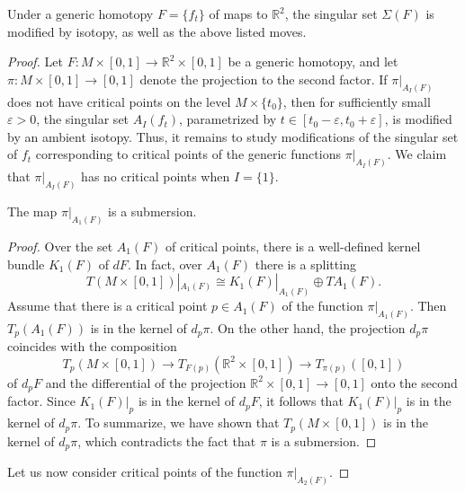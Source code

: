 \documentclass[10pt,a4paper]{amsart}
\def \R{\mathbb{R}}
\def\co{\colon}
\begin{document}
\begin{theorem}\label{th:4}  Under a generic homotopy $F = \{f_t\}$ of maps to $\R^2$, the singular set $\Sigma(F)$ is modified by isotopy,  as well as the above listed moves.
\end{theorem}

\begin{proof}  Let $F\co M\times [0,1]\to \R^2\times [0,1]$ be a generic homotopy, and let $\pi\co M\times [0,1]\to [0,1]$ denote the projection to the second factor. If $\pi|_{A_I(F)}$ does not have critical points on the level $M\times \{t_0\}$, then for sufficiently small $\varepsilon>0$, the singular set $A_I(f_t)$,  parametrized by $t\in [t_0-\varepsilon, t_0+\varepsilon]$,  is modified by an ambient isotopy.  Thus, it remains to study modifications of the singular set of $f_t$ corresponding to critical points of the generic functions $\pi|_{A_I(F)}$.  We claim that $\pi|_{A_I(F)}$ has no critical points when $I=\{1\}$. 

\begin{lemma}\label{le:4}  The map $\pi|_{A_1(F)}$ is a submersion.
\end{lemma}
\begin{proof}   
Over the set $A_1(F)$ of critical points, there is a well-defined kernel bundle $K_1(F)$ of $dF$. In fact, over $A_1(F)$ there is a splitting  
\[
       T(M\times [0,1])|_{A_1(F)} \cong K_1(F)|_{A_1(F)} \oplus TA_1(F). 
\]
Assume that there is a critical point $p\in A_1(F)$ of the function $\pi|_{A_1(F)}$. Then $T_p(A_1(F))$ is in the kernel of $d_p\pi$. On the other hand, the projection $d_p\pi$ coincides with the composition 
\[
      T_p(M\times [0,1])\longrightarrow T_{F(p)}(\R^2\times [0,1])\longrightarrow T_{\pi(p)}([0,1])
\]
of $d_pF$ and the differential of the projection $\R^2\times [0,1]\to [0,1]$ onto the second factor. Since $K_1(F)|_p$ is in the kernel of $d_pF$, it follows that $K_1(F)|_p$ is in the kernel of $d_p\pi$. To summarize, we have shown that $T_p(M\times [0,1])$ is in the kernel of $d_p\pi$, which contradicts the fact that $\pi$ is a submersion.  
\end{proof}

\noindent Let us now consider critical points of the function $\pi|_{A_2(F)}$. 


\end{proof}
\end{document}
